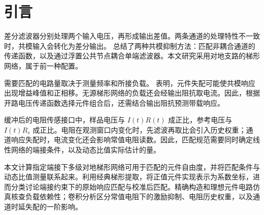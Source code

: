 \section{引言}

差分滤波器分别处理两个输入电压，再形成输出差值。两条通道的处理特性不一致时，共模输入会转化为差分输出。\citet{casas1996basics} 总结了两种共模抑制方法：匹配非耦合通道的传递函数，以及通过浮置公共节点耦合单端滤波器。本文研究采用对地支路的梯形网络，属于前一种配置。

需要匹配的电路量取决于测量频率和所接负载。\citet{hornero2021cm} 表明，元件失配可能使共模响应出现增益峰值和正相移。无源梯形网络的负载还会经输出阻抗取电流。因此，根据开路电压传递函数选择元件组合后，还需结合输出阻抗预测带载响应。

缓冲后的电阻传感接口中，样品电压与 $I(t)R(t)$ 成正比，参考电压与 $I(t)R_s$ 成正比。电阻在观测窗口内变化时，先滤波再取比会引入历史权重；通道响应失配时，电流变化还会影响常值电阻读数。因此，匹配规范需要同时确定线性网络的端接条件，以及动态比值实际估计的量。

本文计算指定端接下多级对地梯形网络可用于匹配的元件自由度，并将匹配条件与动态比值测量联系起来。利用经典梯形提取，将正值元件实现表示为系数坐标，进而分类讨论端接约束下的原始响应匹配与校准后匹配。精确构造和理想元件电路仿真核查负载依赖性；卷积分析区分常值电阻下的激励抑制、电阻历史权重，以及通道时延失配的一阶影响。


